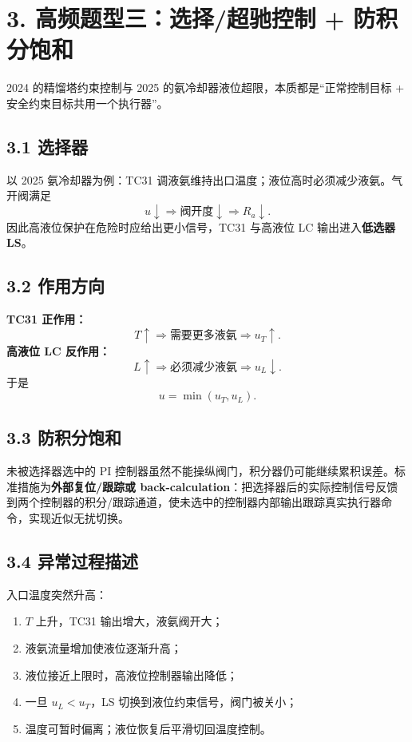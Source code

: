 \documentclass[UTF8,a4paper,10.5pt]{ctexart}
\begin{document}
\section*{3. 高频题型三：选择/超驰控制 + 防积分饱和}
2024 的精馏塔约束控制与 2025 的氨冷却器液位超限，本质都是“正常控制目标 + 安全约束目标共用一个执行器”。

\subsection*{3.1 选择器}
以 2025 氨冷却器为例：TC31 调液氨维持出口温度；液位高时必须减少液氨。气开阀满足
\[
u\downarrow\Rightarrow \text{阀开度}\downarrow\Rightarrow R_a\downarrow.
\]
因此高液位保护在危险时应给出更小信号，TC31 与高液位 LC 输出进入\textbf{低选器 LS}。

\subsection*{3.2 作用方向}
\textbf{TC31 正作用：}
\[
T\uparrow\Rightarrow \text{需要更多液氨}\Rightarrow u_T\uparrow.
\]
\textbf{高液位 LC 反作用：}
\[
L\uparrow\Rightarrow \text{必须减少液氨}\Rightarrow u_L\downarrow.
\]
于是
\[
u=\min(u_T,u_L).
\]

\subsection*{3.3 防积分饱和}
未被选择器选中的 PI 控制器虽然不能操纵阀门，积分器仍可能继续累积误差。标准措施为\textbf{外部复位/跟踪或 back-calculation}：把选择器后的实际控制信号反馈到两个控制器的积分/跟踪通道，使未选中的控制器内部输出跟踪真实执行器命令，实现近似无扰切换。

\subsection*{3.4 异常过程描述}
入口温度突然升高：
\begin{enumerate}[leftmargin=2em,itemsep=1pt]
\item $T$ 上升，TC31 输出增大，液氨阀开大；
\item 液氨流量增加使液位逐渐升高；
\item 液位接近上限时，高液位控制器输出降低；
\item 一旦 $u_L<u_T$，LS 切换到液位约束信号，阀门被关小；
\item 温度可暂时偏离；液位恢复后平滑切回温度控制。
\end{enumerate}
\end{document}
